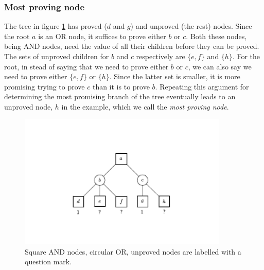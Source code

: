 \documentclass{article}
\begin{document}
\subsubsection*{Most proving node}
The tree in figure \ref{tree:pnex} has proved ($d$ and $g$) and unproved (the rest) nodes. Since the root $a$ is an OR node, it suffices
to prove either $b$ or $c$. Both these nodes, being AND nodes, need the value of all their children before they can be proved. The sets of
unproved children for $b$ and $c$ respectively are $\{e, f\}$ and $\{h\}$. For the root, in stead of saying that we need to prove
either $b$ or $c$, we can also say we need to prove either $\{e, f\}$ or $\{h\}$. Since the latter set is smaller, it is more
promising trying to prove $c$ than it is to prove $b$. Repeating this argument for determining the most promising branch of the tree
eventually leads to an unproved node, $h$ in the example, which we call the \textit{most proving node}.

\begin{figure}[h]
\center
\includegraphics[width=10cm]{proofset.pdf}
\caption{Square AND nodes, circular OR, unproved nodes are labelled with a question mark.}
\label{tree:pnex}
\end{figure}
\end{document}
